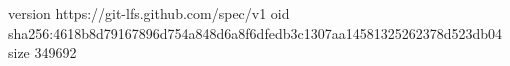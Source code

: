 version https://git-lfs.github.com/spec/v1
oid sha256:4618b8d79167896d754a848d6a8f6dfedb3c1307aa14581325262378d523db04
size 349692
